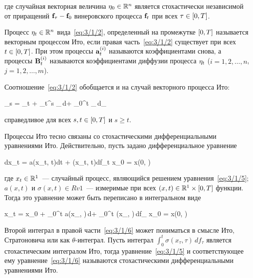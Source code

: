 где случайная векторная величина $\mathbf{\eta}_0 \in \mathbb{R}^{n}$ является стохастически независимой от приращений $\mathbf{f}_\tau - \mathbf{f}_0$ винеровского процесса $\mathbf{f}_t$ при всех $\tau \in [0, T]$.

\begin{df}
    Процесс $\mathbf{\eta}_t \in \mathbb{R}^{n}$ вида~\ref{eq:3/1/2}, определенный на промежутке $[0, T]$ называется векторным процессом Ито, если правая часть~\ref{eq:3/1/2} существует при всех $t \in [0, T]$. При этом процессы $\mathbf{a}_t^{(i)}$ называются коэффициентами снова, а процессы $\mathbf{B}_t^{(i)}$ называются коэффициентами диффузии процесса $\mathbf{\eta}_t$ ($i = 1, 2, \ldots, n$, $j = 1, 2, \ldots, m$).
\end{df}

Соотношение~\ref{eq:3/1/2} обобщается и на случай векторного процесса Ито:

    \eta_s = \eta_t + \int\limits_t^s _\tau\,d\tau + \int\limits_0^t _\tau\,d_\tau {}
\eeq

справедливое для всех $s, t \in [0, T]$ и $s \geqslant t$.

\br

Процессы Ито тесно связаны со стохастическими дифференциальными уравнениями Ито. Действительно, пусть задано дифференциальное уравнение

    dx_t = a(x_t, t)dt + \sigma(x_t, t)df_t \text{; } x_0 = x(0, \omega) \text{,}
\eeq

где $x_t \in \mathbb{R}^{1}$~--- случайный процесс, являющийся решением уравнения~\ref{eq:3/1/5}; $a(x, t)$ и $\sigma(x, t) \in Rv{1}$~--- измеримые при всех $(x, t) \in \mathbb{R}^{1} \times [0, T]$ функции. Тогда это уравнение может быть переписано в интегральном виде

    x_t = x_0 + \int\limits_0^t a(x_\tau, \tau)\,d\tau + \int\limits_0^t \sigma(x_\tau, \tau)\,df_\tau \text{; } x_0 = x(0, \omega) 
\eeq

Второй интеграл в правой части~\ref{eq:3/1/6} может пониматься в смысле Ито, Стратоновича или как $\theta$-интеграл\cite{KUZNETCOV}. Пусть интеграл $\int_0^t \sigma(x_\tau, \tau)\,df_\tau$ является стохастическим интегралом Ито, тогда уравнение~\ref{eq:3/1/5} и соответствующее ему уравнение~\ref{eq:3/1/6} называются стохастическими дифференциальными уравнениями Ито.



